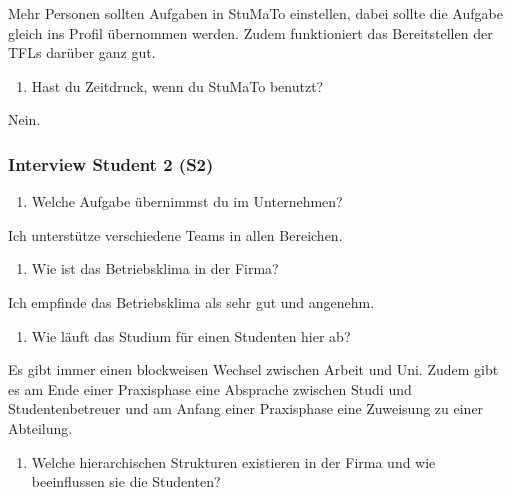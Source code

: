 \documentclass[
  12pt,
  ngerman,
  a4paper,
]{article}
\providecommand{\tightlist}{%
  \setlength{\itemsep}{0pt}\setlength{\parskip}{0pt}}
\begin{document}
Mehr Personen sollten Aufgaben in StuMaTo einstellen, dabei sollte die
Aufgabe gleich ins Profil übernommen werden. Zudem funktioniert das
Bereitstellen der TFLs darüber ganz gut.

\begin{enumerate}
\def\labelenumi{\arabic{enumi}.}
\setcounter{enumi}{17}
\tightlist
\item
  Hast du Zeitdruck, wenn du StuMaTo benutzt?
\end{enumerate}

Nein.

\hypertarget{interview-student-2-s2}{%
\subsubsection{Interview Student 2 (S2)}\label{interview-student-2-s2}}

\begin{enumerate}
\def\labelenumi{\arabic{enumi}.}
\tightlist
\item
  Welche Aufgabe übernimmst du im Unternehmen?
\end{enumerate}

Ich unterstütze verschiedene Teams in allen Bereichen.

\begin{enumerate}
\def\labelenumi{\arabic{enumi}.}
\setcounter{enumi}{1}
\tightlist
\item
  Wie ist das Betriebsklima in der Firma?
\end{enumerate}

Ich empfinde das Betriebsklima als sehr gut und angenehm.

\begin{enumerate}
\def\labelenumi{\arabic{enumi}.}
\setcounter{enumi}{2}
\tightlist
\item
  Wie läuft das Studium für einen Studenten hier ab?
\end{enumerate}

Es gibt immer einen blockweisen Wechsel zwischen Arbeit und Uni. Zudem
gibt es am Ende einer Praxisphase eine Absprache zwischen Studi und
Studentenbetreuer und am Anfang einer Praxisphase eine Zuweisung zu
einer Abteilung.

\begin{enumerate}
\def\labelenumi{\arabic{enumi}.}
\setcounter{enumi}{3}
\tightlist
\item
  Welche hierarchischen Strukturen existieren in der Firma und wie
  beeinflussen sie die Studenten?
\end{enumerate}
\end{document}
